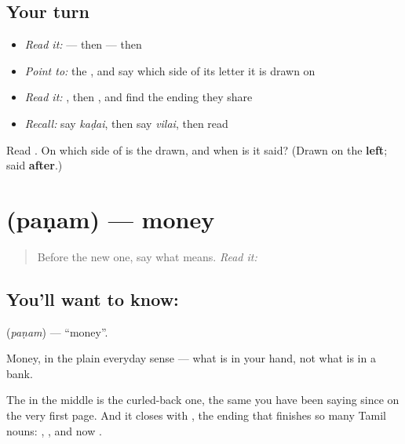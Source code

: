 \subsection*{Your turn}
\begin{itemize}
\raggedright
  \item \emph{Read it:} \textbf{} — then \textbf{} — then \textbf{}
  \item \emph{Point to:} the \textbf{}, and say which side of its letter it is drawn on
  \item \emph{Read it:} \textbf{}, then \textbf{}, and find the ending they share
  \item \emph{Recall:} say \emph{kaḍai}, then say \emph{vilai}, then read \textbf{}
\end{itemize}

\begin{tcolorbox}[breakable,colback=teal!4,colframe=teal!35!black,title={Before you move on}]
Read \textbf{}. On which side of  is the \textbf{} drawn, and when is it said? (Drawn on the \textbf{left}; said \textbf{after}.)
\end{tcolorbox}
\section[\texorpdfstring{\ta{பணம்} (paṇam)}{பணம் (paṇam)}]{ (paṇam) — money}

\label{lesson:TA-C68-money}



\begin{quote}
Before the new one, say what \textbf{} means. \emph{Read it:} \textbf{}
\end{quote}

\subsection*{You'll want to know: }
\textbf{} (\emph{paṇam}) — \textquotedblleft{}money\textquotedblright{}.

Money, in the plain everyday sense — what is in your hand, not what is in a bank.

The  in the middle is the curled-back one, the same  you have been saying since  on the very first page. And it closes with \textbf{}, the ending that finishes so many Tamil nouns: , , and now .

